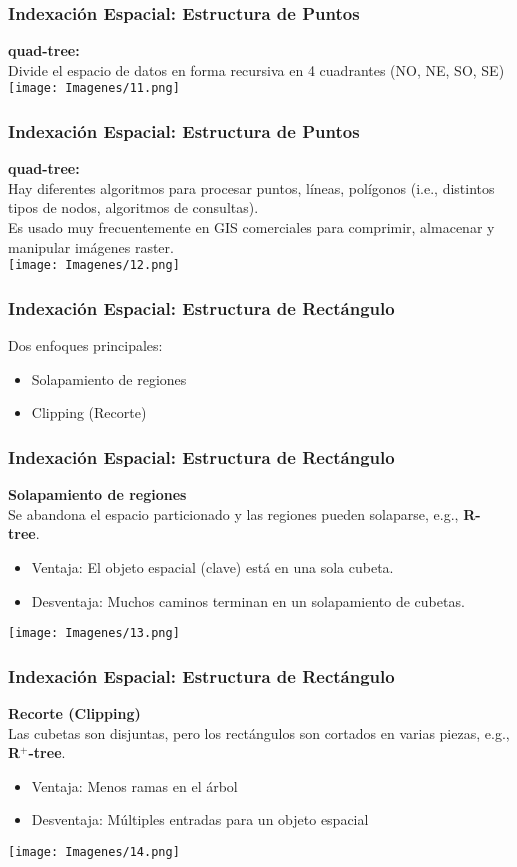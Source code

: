 \documentclass[12pt]{beamer}
\begin{document}
\begin{frame}
\frametitle{Indexaci\'on Espacial: Estructura de Puntos}
\textbf{quad-tree:}\\
Divide el espacio de datos en forma recursiva en 4 cuadrantes (NO, NE, SO, SE)\\
\texttt{[image: Imagenes/11.png]}
\end{frame}


\begin{frame}
\frametitle{Indexaci\'on Espacial: Estructura de Puntos}
\textbf{quad-tree:}\\
Hay diferentes algoritmos para procesar puntos, l\'ineas, pol\'igonos (i.e., distintos tipos de nodos, algoritmos de consultas).\\
Es usado muy frecuentemente en GIS comerciales para comprimir, almacenar y manipular im\'agenes raster.\\
\texttt{[image: Imagenes/12.png]}
\end{frame}

\begin{frame}
\frametitle{Indexaci\'on Espacial: Estructura de Rect\'angulo}
Dos enfoques principales:
\begin{itemize}
\item Solapamiento de regiones
\item Clipping (Recorte)
\end{itemize}
\end{frame}

\begin{frame}
\frametitle{Indexaci\'on Espacial: Estructura de Rect\'angulo}
\textbf{Solapamiento de regiones}\\
Se abandona el espacio particionado y las regiones pueden solaparse, e.g., \textbf{R-tree}.\\
\begin{itemize}
\item Ventaja: El objeto espacial (clave) est\'a en una sola cubeta.
\item Desventaja: Muchos caminos terminan en un solapamiento de cubetas.
\end{itemize}
\begin{center}\texttt{[image: Imagenes/13.png]}
\end{center}
\end{frame}

\begin{frame}
\frametitle{Indexaci\'on Espacial: Estructura de Rect\'angulo}
\textbf{Recorte (Clipping)}\\
Las cubetas son disjuntas, pero los rect\'angulos son cortados en varias piezas, e.g., \textbf{R$^+$-tree}.\\
\begin{itemize}
\item Ventaja: Menos ramas en el \'arbol
\item Desventaja: M\'ultiples entradas para un objeto espacial
\end{itemize}
\begin{center}\texttt{[image: Imagenes/14.png]}
\end{center}
\end{frame}
\end{document}
